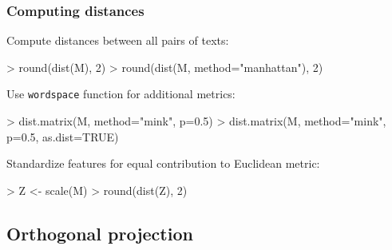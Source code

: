 \documentclass[t]{beamer} %
\begin{document}
\begin{frame}[fragile]
  \frametitle{Computing distances}

Compute distances between all pairs of texts:
\begin{Rcode}
> round(dist(M), 2)  
> round(dist(M, method="manhattan"), 2) 
\end{Rcode}

\gap[1]\pause
Use \texttt{wordspace} function for additional metrics:
\begin{Rcode}
> dist.matrix(M, method="mink", p=0.5)  
> dist.matrix(M, method="mink", p=0.5, as.dist=TRUE)
\end{Rcode}

\gap[1]\pause
Standardize features for equal contribution to Euclidean metric:
\begin{Rcode}
> Z <- scale(M)     
> round(dist(Z), 2) 
\end{Rcode}
\end{frame}

\subsection{Orthogonal projection}
\end{document}
